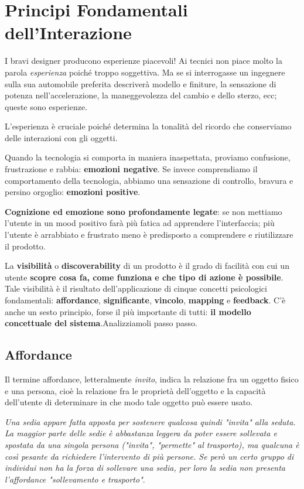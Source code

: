 \documentclass[a4paper,11pt,oneside]{book}
\begin{document}
\pagebreak

\chapter{Principi Fondamentali dell'Interazione}
I bravi designer producono esperienze piacevoli! Ai tecnici non piace molto la parola \textit{esperienza} poiché troppo soggettiva. Ma se si interrogasse un ingegnere sulla sua automobile preferita descriverà modello e finiture, la sensazione di potenza nell'accelerazione, la maneggevolezza del cambio e dello sterzo, ecc; queste sono esperienze.

L'esperienza è cruciale poiché determina la tonalità del ricordo che conserviamo delle interazioni con gli oggetti.

Quando la tecnologia si comporta in maniera inaspettata, proviamo confusione, frustrazione e rabbia: \textbf{emozioni negative}. Se invece comprendiamo il comportamento della tecnologia, abbiamo una sensazione di controllo, bravura e persino orgoglio: \textbf{emozioni positive}.

\textbf{Cognizione ed emozione sono profondamente legate}: se non mettiamo l'utente in un mood positivo farà più fatica ad apprendere l'interfaccia; più l'utente è arrabbiato e frustrato meno è predisposto a comprendere e riutilizzare il prodotto.

La \textbf{visibilità} o \textbf{discoverability} di un prodotto è il grado di facilità con cui un utente \textbf{scopre cosa fa, come funziona e che tipo di azione è possibile}. Tale visibilità è il risultato dell'applicazione di cinque concetti psicologici fondamentali: \textbf{affordance}, \textbf{significante}, \textbf{vincolo}, \textbf{mapping} e \textbf{feedback}. C'è anche un sesto principio, forse il più importante di tutti: \textbf{il modello concettuale del sistema}.Analizziamoli passo passo.

\section{Affordance}
Il termine affordance, letteralmente \textit{invito}, indica la relazione fra un oggetto fisico e una persona, cioè la relazione fra le proprietà dell'oggetto e la capacità dell'utente di determinare in che modo tale oggetto può essere usato.

\textit{Una sedia appare fatta apposta per sostenere qualcosa quindi "invita" alla seduta. La maggior parte delle sedie è abbastanza leggera da poter essere sollevata e spostata da una singola persona ("invita", "permette" al trasporto), ma qualcuna è così pesante da richiedere l'intervento di più persone. Se però un certo gruppo di individui non ha la forza di sollevare una sedia, per loro la sedia non presenta l'affordance "sollevamento e trasporto"}.
\end{document}
